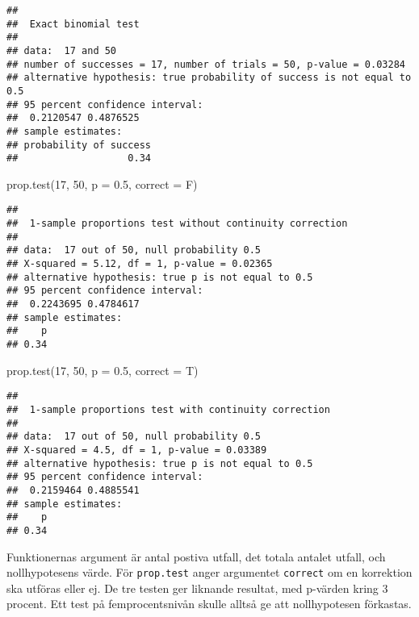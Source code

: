\documentclass[
]{book}
\newenvironment{Shaded}{\begin{snugshade}}{\end{snugshade}}
\newcommand{\AttributeTok}[1]{\textcolor[rgb]{0.77,0.63,0.00}{#1}}
\newcommand{\DecValTok}[1]{\textcolor[rgb]{0.00,0.00,0.81}{#1}}
\newcommand{\FloatTok}[1]{\textcolor[rgb]{0.00,0.00,0.81}{#1}}
\newcommand{\FunctionTok}[1]{\textcolor[rgb]{0.00,0.00,0.00}{#1}}
\newcommand{\NormalTok}[1]{#1}
\theoremstyle{definition}
\theoremstyle{definition}
\theoremstyle{definition}
\theoremstyle{definition}
\theoremstyle{remark}
\begin{document}
\begin{verbatim}
## 
##  Exact binomial test
## 
## data:  17 and 50
## number of successes = 17, number of trials = 50, p-value = 0.03284
## alternative hypothesis: true probability of success is not equal to 0.5
## 95 percent confidence interval:
##  0.2120547 0.4876525
## sample estimates:
## probability of success 
##                   0.34
\end{verbatim}

\begin{Shaded}
\begin{Highlighting}[]
\FunctionTok{prop.test}\NormalTok{(}\DecValTok{17}\NormalTok{, }\DecValTok{50}\NormalTok{, }\AttributeTok{p =} \FloatTok{0.5}\NormalTok{, }\AttributeTok{correct =}\NormalTok{ F)}
\end{Highlighting}
\end{Shaded}

\begin{verbatim}
## 
##  1-sample proportions test without continuity correction
## 
## data:  17 out of 50, null probability 0.5
## X-squared = 5.12, df = 1, p-value = 0.02365
## alternative hypothesis: true p is not equal to 0.5
## 95 percent confidence interval:
##  0.2243695 0.4784617
## sample estimates:
##    p 
## 0.34
\end{verbatim}

\begin{Shaded}
\begin{Highlighting}[]
\FunctionTok{prop.test}\NormalTok{(}\DecValTok{17}\NormalTok{, }\DecValTok{50}\NormalTok{, }\AttributeTok{p =} \FloatTok{0.5}\NormalTok{, }\AttributeTok{correct =}\NormalTok{ T)}
\end{Highlighting}
\end{Shaded}

\begin{verbatim}
## 
##  1-sample proportions test with continuity correction
## 
## data:  17 out of 50, null probability 0.5
## X-squared = 4.5, df = 1, p-value = 0.03389
## alternative hypothesis: true p is not equal to 0.5
## 95 percent confidence interval:
##  0.2159464 0.4885541
## sample estimates:
##    p 
## 0.34
\end{verbatim}

Funktionernas argument är antal postiva utfall, det totala antalet utfall, och nollhypotesens värde. För \texttt{prop.test} anger argumentet \texttt{correct} om en korrektion ska utföras eller ej.
De tre testen ger liknande resultat, med p-värden kring 3 procent. Ett test på femprocentsnivån skulle alltså ge att nollhypotesen förkastas.
\end{document}
